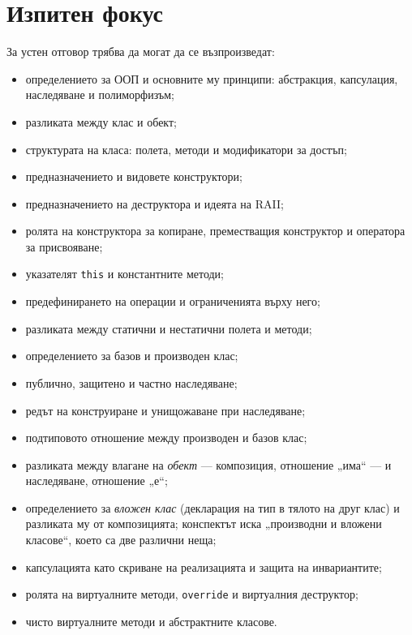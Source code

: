 \section{Изпитен фокус}\label{s:16.5}

За устен отговор трябва да могат да се възпроизведат:

\begin{itemize}
    \item определението за ООП и основните му принципи: абстракция, капсулация, наследяване и полиморфизъм;
    \item разликата между клас и обект;
    \item структурата на класа: полета, методи и модификатори за достъп;
    \item предназначението и видовете конструктори;
    \item предназначението на деструктора и идеята на RAII;
    \item ролята на конструктора за копиране, преместващия конструктор и оператора за присвояване;
    \item указателят \texttt{this} и константните методи;
    \item предефинирането на операции и ограниченията върху него;
    \item разликата между статични и нестатични полета и методи;
    \item определението за базов и производен клас;
    \item публично, защитено и частно наследяване;
    \item редът на конструиране и унищожаване при наследяване;
    \item подтиповото отношение между производен и базов клас;
    \item разликата между влагане на \emph{обект} --- композиция, отношение „има“ --- и наследяване, отношение „е“;
    \item определението за \emph{вложен клас} (декларация на тип в тялото на друг клас) и разликата му от композицията; конспектът иска „производни и вложени класове“, което са две различни неща;
    \item капсулацията като скриване на реализацията и защита на инвариантите;
    \item ролята на виртуалните методи, \texttt{override} и виртуалния деструктор;
    \item чисто виртуалните методи и абстрактните класове.
\end{itemize}
